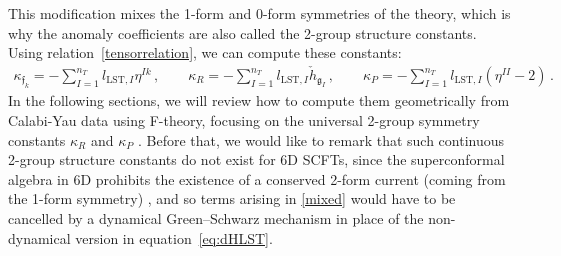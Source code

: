 \documentclass[11pt]{article}
\numberwithin{equation}{section}
\newcommand{\LST}{\text{LST}\xspace}
\begin{document}
This modification mixes the 1-form and 0-form symmetries of the theory, which is why the anomaly coefficients are also called the 2-group structure constants. Using relation~\eqref{tensorrelation}, we can compute these constants:
\begin{align}
\label{2group}
\kappa_{\mathfrak{f}_{k}}=-\sum_{I=1}^{n_{T}}l_{\LST,I}\eta^{Ik}\,,\qquad  
\kappa_{R}=-\sum_{I=1}^{n_{T}}l_{\LST,I}\check{h}_{\mathfrak{g}_{I}}\,,\qquad 
\kappa_{P}=-\sum_{I=1}^{n_{T}}l_{\LST,I}(\eta^{II}-2)\,.
\end{align}
In the following sections, we will review how to compute them geometrically from Calabi-Yau data using F-theory, focusing on the universal 2-group symmetry constants $\kappa_R$ and $\kappa_P$ \cite{DelZotto:2020sop}. Before that, we would like to remark that such continuous 2-group structure constants do not exist for 6D SCFTs, since the superconformal algebra in 6D prohibits the existence of a conserved 2-form current (coming from the 1-form symmetry) \cite{Cordova:2020tij}, and so terms arising in \eqref{mixed} would have to be cancelled by a dynamical Green--Schwarz mechanism in place of the non-dynamical version in equation~\eqref{eq:dHLST}.
\end{document}
